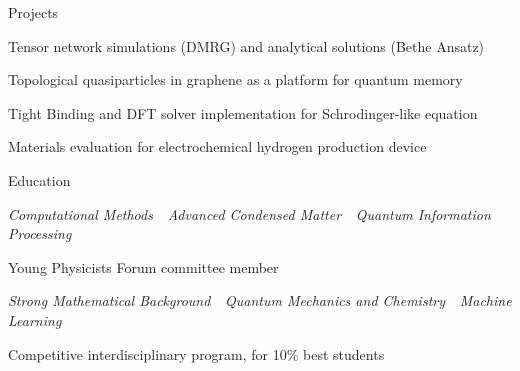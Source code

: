 \documentclass{./cv}
\begin{document}
\begin{cvsection}{Projects}
    \begin{descrlist}
        \item Tensor network simulations (DMRG) and analytical solutions (Bethe Ansatz)
        \item Topological quasiparticles in graphene as a platform for quantum memory
    \end{descrlist}
    \begin{descrlist}
        \item Tight Binding and DFT solver implementation for Schrodinger-like equation
        \item Materials evaluation for electrochemical hydrogen production device
    \end{descrlist}
\end{cvsection}


\begin{cvsection}{Education}
    \begin{descr}
        \textit{Computational Methods \,\vbar\, Advanced Condensed Matter \,\vbar\, Quantum Information Processing}
    \end{descr}
    \begin{descrlist}
        \item Young Physicists Forum committee member
    \end{descrlist}
    \begin{descr}
        \textit{Strong Mathematical Background \,\vbar\, Quantum Mechanics and Chemistry \,\vbar\, Machine Learning}
    \end{descr}
    \begin{descrlist}
        \item Competitive interdisciplinary program, for 10\% best students
    \end{descrlist}
\end{cvsection}

\end{document}
